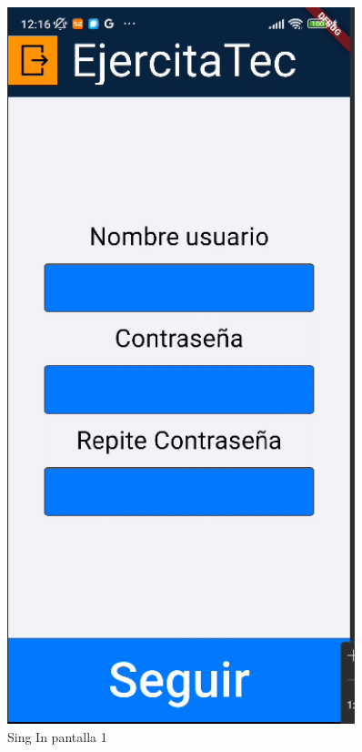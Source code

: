 \begin{figure}[H]
\begin{minipage}{0.45\textwidth}
      \centering
      \includegraphics[width=0.9\textwidth]{pantallas/SingIn1.png}
      \caption{Sing In pantalla 1}
      \label{fig:SingIn1}
   \end{minipage}
\end{figure}

